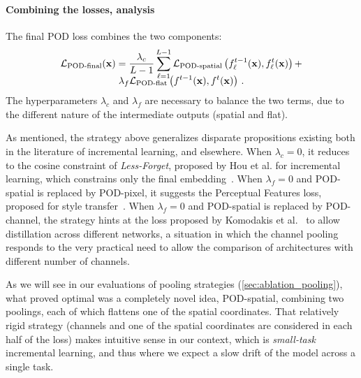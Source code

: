 \paragraph{Combining the losses, analysis} The final POD loss combines the two  components:
%
\begin{multline}
    \mathcal{L}_\text{POD-final}(\mathbf{x}) =  \frac{\lambda_{c}}{L-1}\sum_{\ell=1}^{L-1}  \mathcal{L}_{\text{POD-spatial}}\left(f^{t-1}_\ell(\mathbf{x}), f^t_\ell(\mathbf{x})\right) + \\[-0.8em]
    \lambda_{f} \mathcal{L}_\text{POD-flat}\left(f^{t-1}(\mathbf{x}), f^t(\mathbf{x})\right)\,.
\end{multline}
%
The hyperparameters $\lambda_{c}$ and $\lambda_{f}$ are necessary to balance the two terms, due to
the  different nature of the intermediate outputs (spatial and flat).

As mentioned, the strategy above generalizes disparate propositions existing both in the literature
of incremental learning, and elsewhere. When $\lambda_{c}=0$, it reduces to the cosine constraint of
\textit{Less-Forget}, proposed by Hou et al. for incremental learning, which constrains only the
final embedding~\citep{hou2019ucir}. When $\lambda_{f}=0$ and POD-spatial is replaced by POD-pixel,
it suggests the Perceptual Features loss, proposed for style
transfer~\citep{johnson2016perceptual_losses}. When $\lambda_{f}=0$ and POD-spatial is replaced by
POD-channel, the strategy hints at the loss proposed by Komodakis et
al.~\citep{komodakis2017attention_residual_distillation} to allow distillation across different
networks, a situation in which the channel pooling responds to the very practical need to allow the
comparison of architectures with different number of channels.

As we will see in our evaluations of pooling strategies (\autoref{sec:ablation_pooling}), what
proved optimal was a completely novel idea, POD-spatial, combining two poolings, each of which
flattens one of the spatial coordinates. That relatively rigid strategy (channels and one of the
spatial coordinates are considered in each half of the loss) makes intuitive sense in our context,
which is \textit{small-task} incremental learning, and thus where we expect a slow drift of the
model across a single task.


